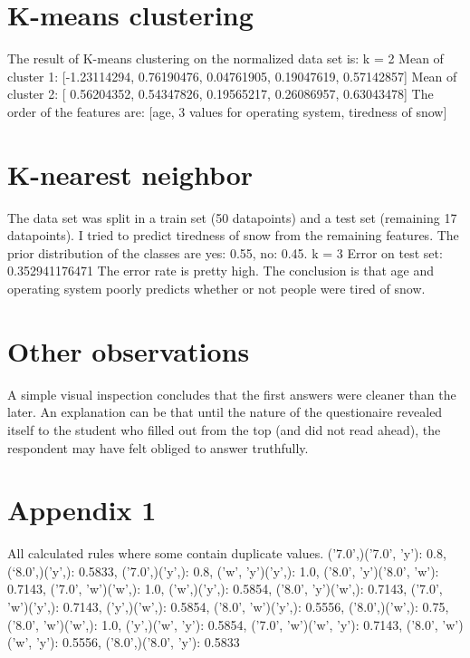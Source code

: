 \documentclass{article}
\begin{document}
\section{K-means clustering}
The result of K-means clustering on the normalized data set is:
k = 2
Mean of cluster 1: [-1.23114294,  0.76190476,  0.04761905,  0.19047619,  0.57142857]
Mean of cluster 2: [ 0.56204352,  0.54347826,  0.19565217,  0.26086957,  0.63043478]
The order of the features are: [age, 3 values for operating system, tiredness of snow]

\section{K-nearest neighbor}
The data set was split in a train set (50 datapoints) and a test set (remaining 17 datapoints).
I tried to predict tiredness of snow from the remaining features. The prior distribution of the classes are yes: 0.55, no: 0.45.
k =  3
Error on test set: 0.352941176471
The error rate is pretty high. The conclusion is that age and operating system poorly predicts whether or not people were tired of snow. 

\section{Other observations}
A simple visual inspection concludes that the first answers were cleaner than the later. An explanation can be that until the nature of the questionaire revealed itself to the student who filled out from the top (and did not read ahead), the respondent may have felt obliged to answer truthfully. 

\clearpage
\section{Appendix 1} 
\label{sec:Appendix1}
All calculated rules where some contain duplicate values. 
('7.0',)('7.0', 'y'): 0.8,
(‘8.0',)('y',): 0.5833, 
('7.0',)('y',): 0.8,
('w', 'y')('y',): 1.0,
('8.0', 'y')('8.0', 'w'): 0.7143,
('7.0', 'w')('w',): 1.0, 
('w',)('y',): 0.5854,
('8.0', 'y')('w',): 0.7143,
('7.0', 'w')('y',): 0.7143,
('y',)('w',): 0.5854,
('8.0', 'w')('y',): 0.5556,
('8.0',)('w',): 0.75,
('8.0', 'w')('w',): 1.0,
('y',)('w', 'y'): 0.5854,
('7.0', 'w')('w', 'y'): 0.7143,
('8.0', 'w')('w', 'y'): 0.5556,
('8.0',)('8.0', 'y'): 0.5833
\end{document}

